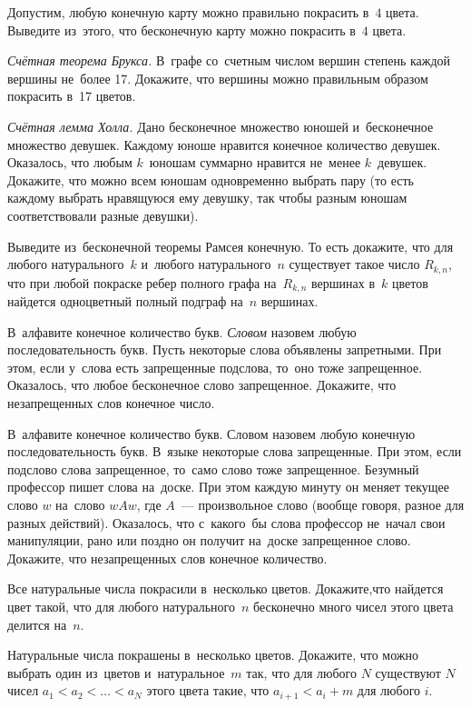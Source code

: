 \begin{problems}

\item
Допустим, любую конечную карту можно правильно покрасить в~$4$ цвета.
Выведите из~этого, что бесконечную карту можно покрасить в~$4$ цвета.

\item \emph{Счётная теорема Брукса.}
В~графе со~счетным числом вершин степень каждой вершины не~более 17.
Докажите, что вершины можно правильным образом покрасить в~17 цветов.

\item \emph{Счётная лемма Холла.}
Дано бесконечное множество юношей и~бесконечное множество девушек.
Каждому юноше нравится конечное количество девушек.
Оказалось, что любым $k$~юношам суммарно нравится не~менее $k$~девушек.
Докажите, что можно всем юношам одновременно выбрать пару
(то есть каждому выбрать нравящуюся ему девушку, так чтобы разным юношам
соответствовали разные девушки).

\item
Выведите из~бесконечной теоремы Рамсея конечную.
То есть докажите, что для любого натурального~$k$ и~любого натурального~$n$
существует такое число $R_{k,n}$, что при любой покраске ребер полного графа
на~$R_{k,n}$ вершинах в~$k$ цветов найдется одноцветный полный подграф
на~$n$ вершинах.

\item
В~алфавите конечное количество букв.
\emph{Словом} назовем любую последовательность букв.
Пусть некоторые слова объявлены запретными.
При этом, если у~слова есть запрещенные подслова, то~оно тоже запрещенное.
Оказалось, что любое бесконечное слово запрещенное.
Докажите, что незапрещенных слов конечное число.

\item
В~алфавите конечное количество букв.
Словом назовем любую конечную последовательность букв.
В~языке некоторые слова запрещенные.
При этом, если подслово слова запрещенное, то~само слово тоже запрещенное.
Безумный профессор пишет слова на~доске.
При этом каждую минуту он меняет текущее слово $w$ на~слово $w A w$, где
$A$~--- произвольное слово (вообще говоря, разное для разных действий).
Оказалось, что с~какого~бы слова профессор не~начал свои манипуляции, рано или
поздно он получит на~доске запрещенное слово.
Докажите, что незапрещенных слов конечное количество.

\item
Все натуральные числа покрасили в~несколько цветов.
Докажите,что найдется цвет такой, что для любого натурального~$n$ бесконечно
много чисел этого цвета делится на~$n$.

\item
Натуральные числа покрашены в~несколько цветов.
Докажите, что можно выбрать один из~цветов и~натуральное~$m$ так, что для
любого $N$ существуют $N$ чисел $a_{1} < a_{2} < \ldots < a_{N}$ этого цвета
такие, что $a_{i+1} < a_{i} + m$ для любого $i$.

\end{problems}

